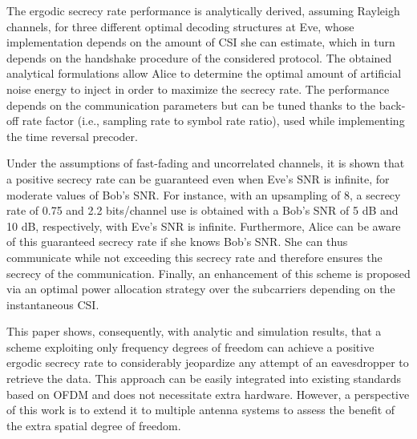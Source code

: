 \documentclass[journal,comsoc]{IEEEtran}
\begin{document}
The ergodic secrecy rate performance is analytically derived, assuming Rayleigh channels, for three different optimal decoding structures at Eve, whose implementation depends on the amount of CSI she can estimate, which in turn depends on the handshake procedure of the considered protocol. The obtained analytical formulations allow Alice to determine the optimal amount of artificial noise energy to inject in order to maximize the secrecy rate. The performance depends on the communication parameters but can be tuned thanks to the back-off rate factor (i.e., sampling rate to symbol rate ratio), used while implementing the time reversal precoder.


Under the assumptions of fast-fading and uncorrelated channels, it is shown that a positive secrecy rate can be guaranteed even when Eve’s SNR is infinite, for moderate values of Bob’s SNR. For instance, with an upsampling of 8, a secrecy rate of 0.75 and 2.2 bits/channel use is obtained with a Bob’s SNR of 5 dB and 10 dB, respectively, with Eve’s SNR is infinite. Furthermore, Alice can be aware of this guaranteed secrecy rate if she knows Bob’s SNR. She can thus communicate while not exceeding this secrecy rate and therefore ensures the secrecy of the communication. Finally, an enhancement of this scheme is proposed via an optimal power allocation strategy over the subcarriers depending on the instantaneous CSI.


This paper shows, consequently, with analytic and simulation results, that a scheme exploiting only frequency degrees of freedom can achieve a positive ergodic secrecy rate to considerably jeopardize any attempt of an eavesdropper to retrieve the data. This approach can be easily integrated into existing standards based on OFDM and does not necessitate extra hardware. However, a perspective of this work is to extend it to multiple antenna systems to assess the benefit of the extra spatial degree of freedom.




%
%
\end{document}
